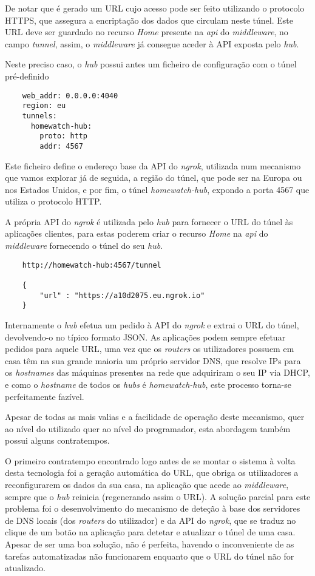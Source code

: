 De notar que é gerado um URL cujo acesso pode ser feito utilizando o protocolo HTTPS, que assegura a encriptação dos dados que circulam neste túnel. Este URL deve ser guardado no recurso \textit{Home} presente na \textit{api} do \textit{middleware}, no campo \textit{tunnel}, assim, o \textit{middleware} já consegue aceder à API exposta pelo \textit{hub}.

Neste preciso caso, o \textit{hub} possui antes um ficheiro de configuração com o túnel pré-definido

\begin{verbatim}
    web_addr: 0.0.0.0:4040
    region: eu
    tunnels:
      homewatch-hub:
        proto: http
        addr: 4567
\end{verbatim}

Este ficheiro define o endereço base da API do \textit{ngrok}, utilizada num mecanismo que vamos explorar já de seguida, a região do túnel, que pode ser na Europa ou nos Estados Unidos, e por fim, o túnel \textit{homewatch-hub}, expondo a porta 4567 que utiliza o protocolo HTTP.

A própria API do \textit{ngrok} é utilizada pelo \textit{hub} para fornecer o URL do túnel às aplicações clientes, para estas poderem criar o recurso \textit{Home} na \textit{api} do \textit{middleware} fornecendo o túnel do seu \textit{hub}.

\begin{verbatim}
    http://homewatch-hub:4567/tunnel

    {
        "url" : "https://a10d2075.eu.ngrok.io"
    }
\end{verbatim}

Internamente o \textit{hub} efetua um pedido à API do \textit{ngrok} e extrai o URL do túnel, devolvendo-o no típico formato JSON. As aplicações podem sempre efetuar pedidos para aquele URL, uma vez que os \textit{routers} os utilizadores possuem em casa têm na sua grande maioria um próprio servidor DNS, que resolve IPs para os \textit{hostnames} das máquinas presentes na rede que adquiriram o seu IP via DHCP, e como o \textit{hostname} de todos os \textit{hubs} é \textit{homewatch-hub}, este processo torna-se perfeitamente fazível.

Apesar de todas as mais valias e a facilidade de operação deste mecanismo, quer ao nível do utilizado quer ao nível do programador, esta abordagem também possui alguns contratempos.

O primeiro contratempo encontrado logo antes de se montar o sistema à volta desta tecnologia foi a geração automática do URL, que obriga os utilizadores a reconfigurarem os dados da sua casa, na aplicação que acede ao \textit{middleware}, sempre que o \textit{hub} reinicia (regenerando assim o URL). A solução parcial para este problema foi o desenvolvimento do mecanismo de deteção à base dos servidores de DNS locais (dos \textit{routers} do utilizador) e da API do \textit{ngrok}, que se traduz no clique de um botão na aplicação para detetar e atualizar o túnel de uma casa. Apesar de ser uma boa solução, não é perfeita, havendo o inconveniente de as tarefas automatizadas não funcionarem enquanto que o URL do túnel não for atualizado.

